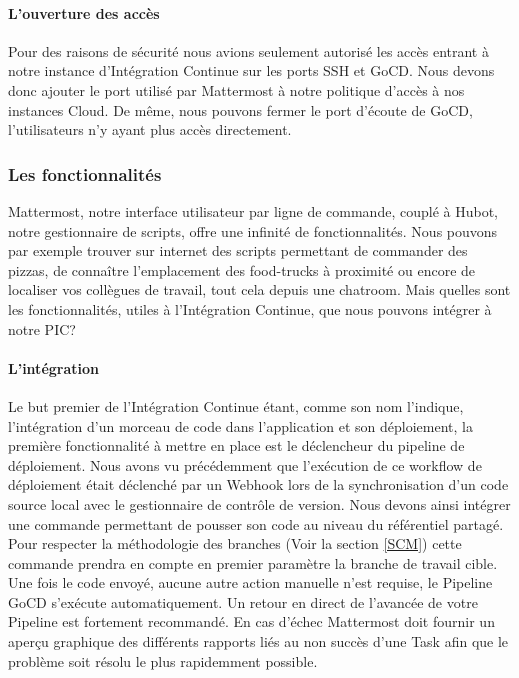           \paragraph{L'ouverture des accès}
          Pour des raisons de sécurité nous avions seulement autorisé les accès entrant à notre instance d'Intégration Continue sur les ports SSH et GoCD. Nous devons donc ajouter le port utilisé par Mattermost à notre politique d'accès à nos instances Cloud. De même, nous pouvons fermer le port d'écoute de GoCD, l'utilisateurs n'y ayant plus accès directement.

        \subsubsection{Les fonctionnalités}
        Mattermost, notre interface utilisateur par ligne de commande, couplé à Hubot, notre gestionnaire de scripts, offre une infinité de fonctionnalités. Nous pouvons par exemple trouver sur internet des scripts permettant de commander des pizzas, de connaître l'emplacement des food-trucks à proximité ou encore de localiser vos collègues de travail, tout cela depuis une chatroom. Mais quelles sont les fonctionnalités, utiles à l'Intégration Continue, que nous pouvons intégrer à notre PIC?

          \paragraph{L'intégration} Le but premier de l'Intégration Continue étant, comme son nom l'indique, l'intégration d'un morceau de code dans l'application et son déploiement, la première fonctionnalité à mettre en place est le déclencheur du pipeline de déploiement. Nous avons vu précédemment que l'exécution de ce workflow de déploiement était déclenché par un Webhook lors de la synchronisation d'un code source local avec le gestionnaire de contrôle de version. Nous devons ainsi intégrer une commande permettant de pousser son code au niveau du référentiel partagé. Pour respecter la méthodologie des branches (Voir la section \ref{SCM}) cette commande prendra en compte en premier paramètre la branche de travail cible. Une fois le code envoyé, aucune autre action manuelle n'est requise, le Pipeline GoCD s'exécute automatiquement. Un retour en direct de l'avancée de votre Pipeline est fortement recommandé. En cas d'échec Mattermost doit fournir un aperçu graphique des différents rapports liés au non succès d'une Task afin que le problème soit résolu le plus rapidemment possible.

